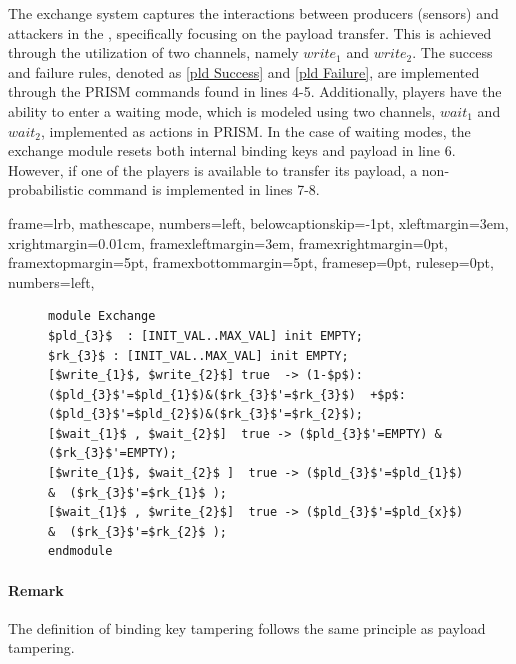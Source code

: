 The exchange system captures the interactions between producers (sensors) and attackers in the , specifically focusing on the payload transfer. This is achieved through the utilization of two channels, namely $write_{1}$ and $write_{2}$. The success and failure rules, denoted as \ref{pld Success} and \ref{pld Failure}, are implemented through the PRISM commands found in lines 4-5. Additionally, players have the ability to enter a waiting mode, which is modeled using two channels, $wait_{1}$ and $wait_{2}$, implemented as actions in PRISM. In the case of waiting modes, the exchange module resets both internal binding keys and payload in line 6. However, if one of the players is available to transfer its payload, a non-probabilistic command is implemented in lines 7-8.

{
	frame=lrb,         
	mathescape,
	numbers=left,
	belowcaptionskip=-1pt,
    xleftmargin=3em,
		xrightmargin=0.01cm,
    framexleftmargin=3em,
	framexrightmargin=0pt,
	framextopmargin=5pt,
	framexbottommargin=5pt,
	framesep=0pt,
	rulesep=0pt,
	numbers=left,
}



\begin{figure}[!htb]            
\begin{minipage}{16.5cm}
\begin{lstlisting}[style=framed,%customc,
	caption=PRISM code for Exchange Module,
 	label=exchangemodel]	
module Exchange
$pld_{3}$  : [INIT_VAL..MAX_VAL] init EMPTY;
$rk_{3}$ : [INIT_VAL..MAX_VAL] init EMPTY;
[$write_{1}$, $write_{2}$] true  -> (1-$p$):($pld_{3}$'=$pld_{1}$)&($rk_{3}$'=$rk_{3}$)  +$p$:($pld_{3}$'=$pld_{2}$)&($rk_{3}$'=$rk_{2}$);
[$wait_{1}$ , $wait_{2}$]  true -> ($pld_{3}$'=EMPTY) & ($rk_{3}$'=EMPTY);
[$write_{1}$, $wait_{2}$ ]  true -> ($pld_{3}$'=$pld_{1}$) &  ($rk_{3}$'=$rk_{1}$ );
[$wait_{1}$ , $write_{2}$]  true -> ($pld_{3}$'=$pld_{x}$) &  ($rk_{3}$'=$rk_{2}$ );
endmodule
\end{lstlisting}
 \end{minipage}  
\end{figure}

\paragraph*{Remark}The definition of binding key tampering follows the same principle as payload tampering.

